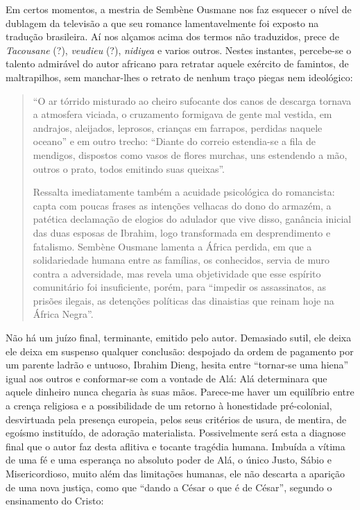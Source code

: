 \documentclass[
  letterpaper,
  DIV=11,
  numbers=noendperiod]{scrreprt}
\begin{document}
Em certos momentos, a mestria de Sembène Ousmane nos faz esquecer o
nível de dublagem da televisão a que seu romance lamentavelmente foi
exposto na tradução brasileira. Aí nos alçamos acima dos termos não
traduzidos, prece de \emph{Tacousane} (?), \emph{veudieu} (?),
\emph{nidiyea} e varios outros. Nestes instantes, percebe-se o talento
admirável do autor africano para retratar aquele exército de famintos,
de maltrapilhos, sem manchar-lhes o retrato de nenhum traço piegas nem
ideológico:

\begin{quote}
``O ar tórrido misturado ao cheiro sufocante dos canos de descarga
tornava a atmosfera viciada, o cruzamento formigava de gente mal
vestida, em andrajos, aleijados, leprosos, crianças em farrapos,
perdidas naquele oceano'' e em outro trecho: ``Diante do correio
estendia-se a fila de mendigos, dispostos como vasos de flores murchas,
uns estendendo a mão, outros o prato, todos emitindo suas queixas''.

Ressalta imediatamente também a acuidade psicológica do romancista:
capta com poucas frases as intenções velhacas do dono do armazém, a
patética declamação de elogios do adulador que vive disso, ganância
inicial das duas esposas de Ibrahim, logo transformada em desprendimento
e fatalismo. Sembène Ousmane lamenta a África perdida, em que a
solidariedade humana entre as famílias, os conhecidos, servia de muro
contra a adversidade, mas revela uma objetividade que esse espírito
comunitário foi insuficiente, porém, para ``impedir os assassinatos, as
prisões ilegais, as detenções políticas das dinaistias que reinam hoje
na África Negra''.
\end{quote}

Não há um juízo final, terminante, emitido pelo autor. Demasiado sutil,
ele deixa ele deixa em suspenso qualquer conclusão: despojado da ordem
de pagamento por um parente ladrão e untuoso, Ibrahim Dieng, hesita
entre ``tornar-se uma hiena'' igual aos outros e conformar-se com a
vontade de Alá: Alá determinara que aquele dinheiro nunca chegaria às
suas mãos. Parece-me haver um equilíbrio entre a crença religiosa e a
possibilidade de um retorno à honestidade pré-colonial, desvirtuada pela
presença europeia, pelos seus critérios de usura, de mentira, de egoísmo
instituído, de adoração materialista. Possivelmente será esta a diagnose
final que o autor faz desta aflitiva e tocante tragédia humana. Imbuída
a vítima de uma fé e uma esperança no absoluto poder de Alá, o único
Justo, Sábio e Misericordioso, muito além das limitações humanas, ele
não descarta a aparição de uma nova justiça, como que ``dando a César o
que é de César'', segundo o ensinamento do Cristo:
\end{document}
